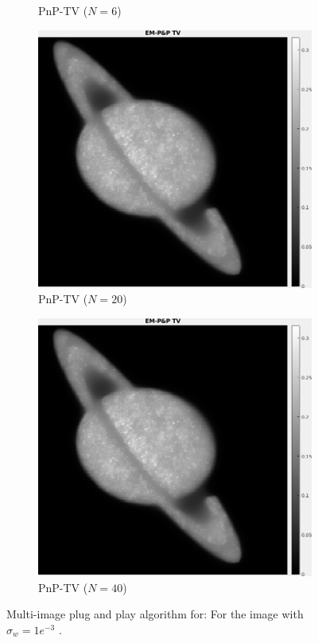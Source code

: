 \documentclass[a4paper, 11pt]{article}
\begin{document}
\begin{figure}[h]
\begin{subfigure}[b]{0.22\textwidth}
        \caption{PnP-TV ($N=6$)}
        \label{fig:PnP-1}
    \end{subfigure}
    \begin{subfigure}[b]{0.22\textwidth}
        \includegraphics[width=\textwidth]{../Figures/PnPReconstructionNoiseSigma1e-3Realization20.png}
        \caption{PnP-TV ($N=20$)}
        \label{fig:PnP0}
    \end{subfigure}
    \begin{subfigure}[b]{0.22\textwidth}
        \includegraphics[width=\textwidth]{../Figures/PnPReconstructionNoiseSigma1e-3Realization20.png}
        \caption{PnP-TV ($N=40$)}
        \label{fig:PnP1}
    \end{subfigure}
\caption{Multi-image plug and play algorithm for: For the image with $\sigma_w=1e^{-3}$  .}
\label{fig:inversionModel}
\end{figure}
\end{document}

